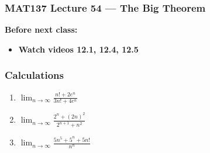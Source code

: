 \documentclass[14pt]{beamer}
\begin{document}
\begin{frame}
	\frametitle{MAT137 Lecture 54 --- The Big Theorem}

	\vfill
	{\bf Before next class:}
		\begin{itemize} \normalsize
			\item {\bf Watch videos 12.1, 12.4, 12.5}
		\end{itemize}
\end{frame}
	\begin{frame}[t]
		\frametitle{Calculations}

		\begin{enumerate}
			\item ${\displaystyle \lim_{n \to \infty} \frac{n! + 2 e^{n}}{3n! + 4 e^{n}} }$

				\vfill

			\item ${\displaystyle \lim_{n \to \infty} \frac{2^{n} + (2n)^{2} }{2^{n+1}+ n^{2} } }$

				\vfill

			\item ${\displaystyle \lim_{n \to \infty} \frac{5n^{5}+ 5^{n} + 5n! }{n^{n}} }$
		\end{enumerate}

		\vfill
	\end{frame}
\end{document}
